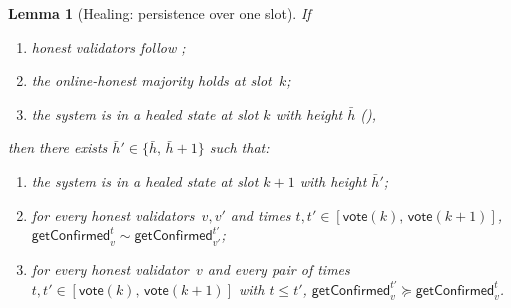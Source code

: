 \ifx\litemode\undefined\documentclass{article}\fi
\newcommand{\vote}{\mathsf{vote}}
\newcommand{\comm}[1]{\bar{#1}}
\newcommand{\getConfirmed}{\textsf{getConfirmed}\xspace}
\theoremstyle{plain}
\newtheorem{lemma}{Lemma}
\theoremstyle{definition}
\theoremstyle{remark}
\newcommand{\OHM}{online-honest majority\xspace}
\begin{document}
\begin{lemma}[Healing: persistence over one slot]\label{rev:lem:healing-persistence}
If
\begin{enumerate}
  \item honest validators follow ;
  \item the \OHM holds at slot~$k$;
  \item the system is in a healed state at slot $k$ with height $\comm{h}$ (),
\end{enumerate}
then there exists $\comm{h}' \in \{\comm{h},\, \comm{h}+1\}$ such that:
\begin{enumerate}
  \item the system is in a healed state at slot $k+1$ with height $\comm{h}'$;
  \item for every honest validators~$v,v'$ and times $t, t' \in [\vote(k),\, \vote(k+1)]$, $\getConfirmed_v^{t} \sim \getConfirmed_{v'}^{t'}$;
  \item for every honest validator~$v$ and every pair of times $t, t' \in [\vote(k),\, \vote(k+1)]$ with $t \leq t'$, $\getConfirmed_v^{t'} \succeq \getConfirmed_v^t$.
\end{enumerate}
\end{lemma}
\end{document}
